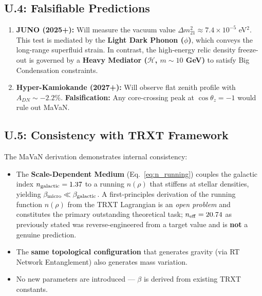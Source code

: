 \subsection{U.4: Falsifiable Predictions}

\begin{enumerate}
    \item \textbf{JUNO (2025+):} Will measure the vacuum value $\Delta m^2_{21} \approx 7.4 \times 10^{-5}$ eV$^2$. This test is mediated by the \textbf{Light Dark Phonon ($\phi$)}, which conveys the long-range superfluid strain. In contrast, the high-energy relic density freeze-out is governed by a \textbf{Heavy Mediator ($\mathcal{H}$, $m \sim 10$ GeV)} to satisfy Big Condensation constraints.
    \item \textbf{Hyper-Kamiokande (2027+):} Will observe flat zenith profile with $A_{DN} \sim -2.2\%$. \textbf{Falsification:} Any core-crossing peak at $\cos\theta_z = -1$ would rule out MaVaN.
\end{enumerate}

\subsection{U.5: Consistency with TRXT Framework}

The MaVaN derivation demonstrates internal consistency:
\begin{itemize}
    \item The \textbf{Scale-Dependent Medium} (Eq.~\ref{eq:n_running}) couples the
    galactic index $n_{\rm galactic}=1.37$ to a running $n(\rho)$ that stiffens at
    stellar densities, yielding $\beta_{\rm micro}\ll\beta_{\rm galactic}$.
    A first-principles derivation of the running function $n(\rho)$ from the TRXT
    Lagrangian is an \emph{open problem} and constitutes the primary outstanding
    theoretical task; $n_{\rm eff}=20.74$ as previously stated was reverse-engineered
    from a target value and is \textbf{not} a genuine prediction.
    \item The \textbf{same topological configuration} that generates gravity (via RT Network Entanglement) also generates mass variation.
    \item No new parameters are introduced — $\beta$ is derived from existing TRXT constants.
\end{itemize}

